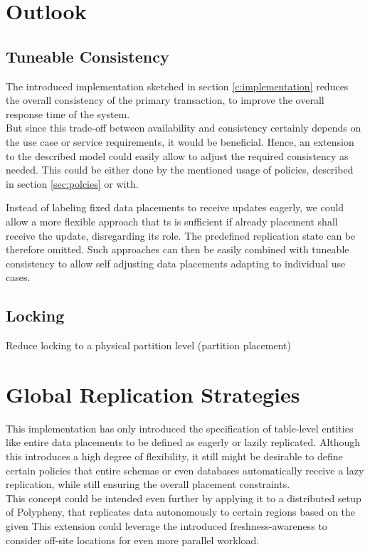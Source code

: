 
\section{Outlook}

\subsection{Tuneable Consistency}
The introduced implementation sketched in section \ref{c:implementation} reduces the overall consistency of the primary transaction,
to improve the overall response time of the system.\\ 
But since this trade-off between availability and consistency certainly depends on the use case or service requirements, it would be beneficial.
Hence, an extension to the described model could easily allow to adjust the required consistency as needed. 
This could be either done by the mentioned usage of policies, described in section \ref{sec:polcies} or with.

Instead of labeling fixed data placements to receive updates eagerly, we could allow a more flexible approach that ts is sufficient if already placement 
shall receive the update, disregarding its role. The predefined replication state can be therefore omitted. 
Such approaches can then be easily combined with tuneable consistency to allow self adjusting data placements  adapting to individual use cases.

\subsection{Locking}
Reduce locking to a physical partition level  (partition placement)





\tocless\section{Global Replication Strategies}
This implementation has only introduced the specification of table-level entities like entire data placements to be defined as eagerly or lazily replicated.
Although this introduces a high degree of flexibility, it still might be desirable to define certain policies that entire schemas or even databases automatically 
receive a lazy replication, while still ensuring the overall placement constraints.\\
This concept could be intended even further by applying it to a distributed setup of Polypheny, that replicates data autonomously to certain regions based on the given 
This extension could leverage the introduced freshness-awareness to consider off-site locations for even more parallel workload.